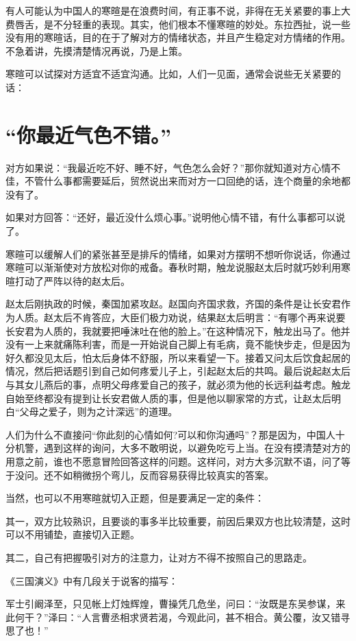 \documentclass[fontset=fandol, a4paper, 12pt, openright]{ctexbook}
\begin{document}
有人可能认为中国人的寒暄是在浪费时间，有正事不说，非得在无关紧要的事上大费唇舌，是不分轻重的表现。其实，他们根本不懂寒暄的妙处。东拉西扯，说一些没有用的寒暄话，目的在于了解对方的情绪状态，并且产生稳定对方情绪的作用。不急着讲，先摸清楚情况再说，乃是上策。

寒暄可以试探对方适宜不适宜沟通。比如，人们一见面，通常会说些无关紧要的话：

\section{“你最近气色不错。”}

对方如果说：“我最近吃不好、睡不好，气色怎么会好？”那你就知道对方心情不佳，不管什么事都需要延后，贸然说出来而对方一口回绝的话，连个商量的余地都没有了。

如果对方回答：“还好，最近没什么烦心事。”说明他心情不错，有什么事都可以说了。

寒暄可以缓解人们的紧张甚至是排斥的情绪，如果对方摆明不想听你说话，你通过寒暄可以渐渐使对方放松对你的戒备。春秋时期，触龙说服赵太后时就巧妙利用寒暄打动了严阵以待的赵太后。

赵太后刚执政的时候，秦国加紧攻赵。赵国向齐国求救，齐国的条件是让长安君作为人质。赵太后不肯答应，大臣们极力劝说，结果赵太后明言：“有哪个再来说要长安君为人质的，我就要把唾沫吐在他的脸上。”在这种情况下，触龙出马了。他并没有一上来就痛陈利害，而是一开始说自己脚上有毛病，竟不能快步走，但是因为好久都没见太后，怕太后身体不舒服，所以来看望一下。接着又问太后饮食起居的情况，然后把话题引到自己如何疼爱儿子上，引起赵太后的共鸣。最后说起赵太后与其女儿燕后的事，点明父母疼爱自己的孩子，就必须为他的长远利益考虑。触龙自始至终都没有提到让长安君做人质的事，但是他以聊家常的方式，让赵太后明白“父母之爱子，则为之计深远”的道理。

人们为什么不直接问“你此刻的心情如何?可以和你沟通吗”？那是因为，中国人十分机警，遇到这样的询问，大多不敢明说，以避免吃亏上当。在没有摸清楚对方的用意之前，谁也不愿意冒险回答这样的问题。这样问，对方大多沉默不语，问了等于没问。还不如稍微拐个弯儿，反而容易获得比较真实的答案。

当然，也可以不用寒暄就切入正题，但是要满足一定的条件：

其一，双方比较熟识，且要谈的事多半比较重要，前因后果双方也比较清楚，这时可以不用铺垫，直接切入正题。

其二，自己有把握吸引对方的注意力，让对方不得不按照自己的思路走。

《三国演义》中有几段关于说客的描写：

军士引阚泽至，只见帐上灯烛辉煌，曹操凭几危坐，问曰：“汝既是东吴参谋，来此何干？”泽曰：“人言曹丞相求贤若渴，今观此问，甚不相合。黄公覆，汝又错寻思了也！”
\end{document}
